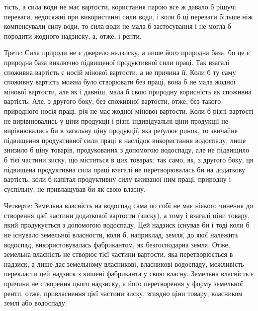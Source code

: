 тість, а сила води не має вартости, користання парою все ж давало б рішучі
переваги, недосяжні при використанні сили води, і коли б ці переваги більше
ніж компенсували силу води, то сила води не мала б застосування і не могла б
породити жодного надзиску, а, отже, і ренти.

Третє: Сила природи не є джерело надзиску, а лише його природна
база, бо це є природна база виключно підвищеної продуктивної сили праці. Так
взагалі споживна вартість є носій мінової вартости, а не причина її. Коли б
ту саму споживну вартість можна було створювати без праці, вона б не мала
жодної мінової вартости, але як і давніш, мала б свою природну корисність
як споживна вартість. Але, з другого боку, без споживної вартости, отже,
без такого природного носія праці, річ не має жодної мінової вартости. Коли б
різні вартості не вирівнювались у ціни продукції і різні індивідуальні ціни
продукції не вирівнювались би в загальну ціну продукції, яка реґулює ринок,
то звичайне підвищення продуктивної сили праці в наслідок використання водоспаду,
лише знизило б ціну товарів, продукованих з допомогою водоспаду, але
не підвищило б тієї частини зиску, що міститься в цих товарах; так само, як,
з другого боку, ця підвищена продуктивна сила праці взагалі не перетворювалась
би на додаткову вартість, коли б капітал продуктивну силу вживаної ним
праці, природну і суспільну, не привлащував би як свою власну.

Четверте: Земельна власність на водоспад сама по собі не має ніякого
чинення до створення цієї частини додаткової вартости (зиску), а тому і взагалі
ціни товару, який продукується з допомогою водоспаду. Цей надзиск існував
би і тоді коли б не існувало земельної власности, коли б, наприклад,
земля, до якої належить водоспад, використовувалась фабрикантом, як безгосподарна
земля. Отже, земельна власність не створює тієї частини вартости,
яка перетворюється в надзиск, а лише дає земельному власникові, власникові
водоспаду, можливість перекласти цей надзиск з кишені фабриканта у свою
власну. Земельна власність є причина не створення цього надзиску, а його
перетворення у форму земельної ренти, отже, привласнення цієї частини зиску,
зглядно ціни товару, власником землі або водоспаду.

